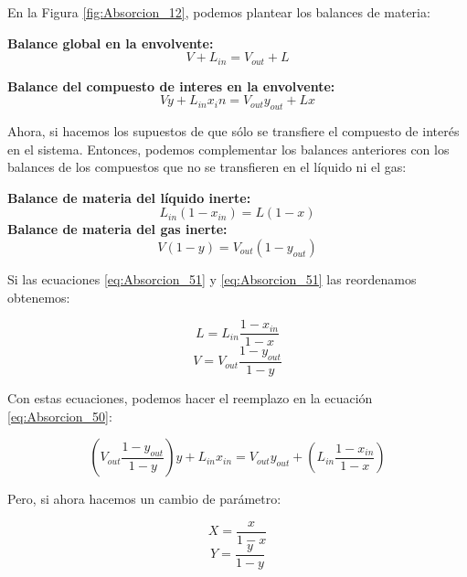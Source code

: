 \documentclass[11pt]{book}
\begin{document}
En la Figura \ref{fig:Absorcion_12}, podemos plantear los balances de materia:

\textbf{Balance global en la envolvente:}
\begin{equation}
    \label{eq:Absorcion_49}
    V + L_{in} = V_{out} + L
\end{equation}

\textbf{Balance del compuesto de interes en la envolvente:}
\begin{equation}
    \label{eq:Absorcion_50}
    V y + L_{in} x_in = V_{out} y_{out} + L x
\end{equation}

Ahora, si hacemos los supuestos de que sólo se transfiere el compuesto de interés en el sistema. Entonces, podemos complementar los balances anteriores con los balances de los compuestos que no se transfieren en el líquido ni el gas:

\textbf{Balance de materia del líquido inerte:}
\begin{equation}
    \label{eq:Absorcion_51}
    L_{in} (1 - x_{in}) = L (1 - x)
\end{equation}
\textbf{Balance de materia del gas inerte:}
\begin{equation}
    \label{eq:Absorcion_52}
    V (1 - y) = V_{out} (1 - y_{out})
\end{equation}

Si las ecuaciones \ref{eq:Absorcion_51} y \ref{eq:Absorcion_51} las reordenamos obtenemos:

\begin{equation}
    \label{eq:Absorcion_53}
    L = L_{in} \frac{1 - x_{in}}{1 - x}
\end{equation}
\begin{equation}
    \label{eq:Absorcion_54}
    V = V_{out} \frac{1 - y_{out}}{1 - y}
\end{equation}

Con estas ecuaciones, podemos hacer el reemplazo en la ecuación \ref{eq:Absorcion_50}:

\begin{equation}
    \label{eq:Absorcion_55}
    \left( V_{out} \frac{1 - y_{out}}{1 - y}\right) y + L_{in} x_{in} = V_{out} y_{out} + \left( L_{in} \frac{1 - x_{in}}{1 - x}\right)
\end{equation}

Pero, si ahora hacemos un cambio de parámetro:

\begin{equation*}
    X = \frac{x}{1-x}
\end{equation*}
\begin{equation*}
    Y = \frac{y}{1-y}
\end{equation*}
\end{document}
